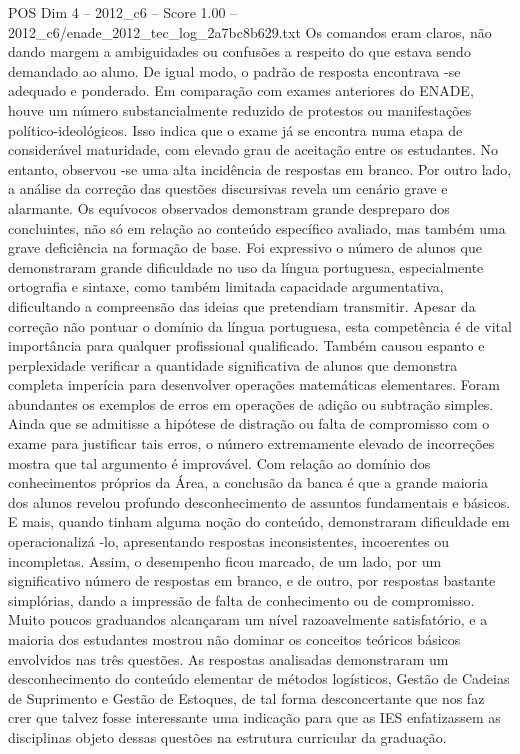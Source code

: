 \begin{textsample}{POS Dim 4 – 2012\_c6 – Score 1.00 – 2012\_c6/enade\_2012\_tec\_log\_2a7bc8b629.txt}
Os comandos eram claros, não dando margem a ambiguidades ou confusões a respeito do que estava sendo demandado ao aluno.
De igual modo, o padrão de resposta encontrava -se adequado e ponderado.
Em comparação com exames anteriores do ENADE, houve um número substancialmente reduzido de protestos ou manifestações político-ideológicos.
Isso indica que o exame já se encontra numa etapa de considerável maturidade, com elevado grau de aceitação entre os estudantes.
No entanto, observou -se uma alta incidência de respostas em branco.
Por outro lado, a análise da correção das questões discursivas revela um cenário grave e alarmante.
Os equívocos observados demonstram grande despreparo dos concluintes, não só em relação ao conteúdo específico avaliado, mas também uma grave deficiência na formação de base.
Foi expressivo o número de alunos que demonstraram grande dificuldade no uso da língua portuguesa, especialmente ortografia e sintaxe, como também limitada capacidade argumentativa, dificultando a compreensão das ideias que pretendiam transmitir.
Apesar da correção não pontuar o domínio da língua portuguesa, esta competência é de vital importância para qualquer profissional qualificado.
Também causou espanto e perplexidade verificar a quantidade significativa de alunos que demonstra completa imperícia para desenvolver operações matemáticas elementares.
Foram abundantes os exemplos de erros em operações de adição ou subtração simples.
Ainda que se admitisse a hipótese de distração ou falta de compromisso com o exame para justificar tais erros, o número extremamente elevado de incorreções mostra que tal argumento é improvável.
Com relação ao domínio dos conhecimentos próprios da Área, a conclusão da banca é que a grande maioria dos alunos revelou profundo desconhecimento de assuntos fundamentais e básicos.
E mais, quando tinham alguma noção do conteúdo, demonstraram dificuldade em operacionalizá -lo, apresentando respostas inconsistentes, incoerentes ou incompletas.
Assim, o desempenho ficou marcado, de um lado, por um significativo número de respostas em branco, e de outro, por respostas bastante simplórias, dando a impressão de falta de conhecimento ou de compromisso.
Muito poucos graduandos alcançaram um nível razoavelmente satisfatório, e a maioria dos estudantes mostrou não dominar os conceitos teóricos básicos envolvidos nas três questões.
As respostas analisadas demonstraram um desconhecimento do conteúdo elementar de métodos logísticos, Gestão de Cadeias de Suprimento e Gestão de Estoques, de tal forma desconcertante que nos faz crer que talvez fosse interessante uma indicação para que as IES enfatizassem as disciplinas objeto dessas questões na estrutura curricular da graduação.

\end{textsample}
